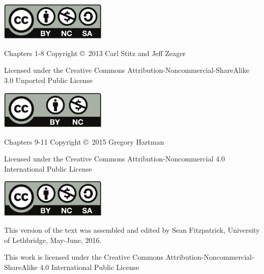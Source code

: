 \noindent\hskip -1in\begin{minipage}{2.1in}
\begin{center}
\includegraphics[width=2in]{figures/license}
\end{center}
\end{minipage}
\begin{minipage}{3in}
Chapters 1-8 Copyright \copyright\ 2013 Carl Stitz and Jeff Zeager

Licensed under the Creative Commons Attribution-Noncommercial-ShareAlike 3.0 Unported Public License
\end{minipage}

\bigskip

\bigskip

\bigskip


\noindent\hskip-1in\begin{minipage}{2.1in}
\begin{center}
\includegraphics[width=2in]{text/by-nc} 
\end{center}
\end{minipage}
\begin{minipage}{3in}
Chapters 9-11 Copyright \copyright\ 2015 Gregory Hartman

Licensed under the Creative Commons Attribution-Noncommercial 4.0 International Public License
\end{minipage}

\bigskip

\bigskip

\bigskip

\noindent\hskip-1in\begin{minipage}{2.2in}
\begin{center}
\includegraphics[width=2in]{figures/license}
\end{center}
\end{minipage}
\begin{minipage}{3in}
This version of the text was assembled and edited by Sean Fitzpatrick, University of Lethbridge, May-June, 2016. 

This work is licensed under the Creative Commons Attribution-Noncommercial-ShareAlike 4.0 International Public License
\end{minipage}
